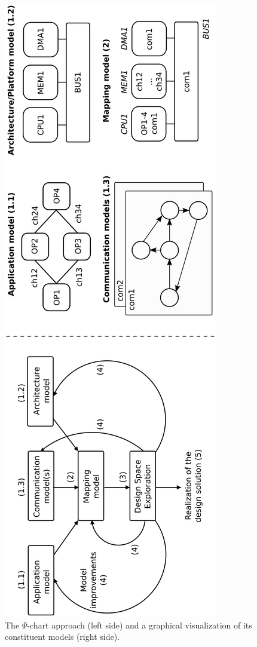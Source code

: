 \documentclass{llncs}
\begin{document}
\begin{figure}[htbp]
	\includegraphics[angle=-90,origin=c,width=\textwidth]{figures/applicationModel.pdf}
	\vspace{-17em}
	\caption{The $\Psi$-chart approach (left side) and a graphical visualization of its constituent models (right
side).}
	\label{fig:Tchart}
\end{figure}
\end{document}
